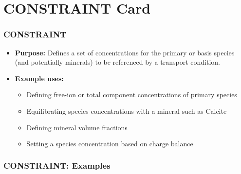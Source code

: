 \section{CONSTRAINT Card}

\begin{frame}\frametitle{CONSTRAINT}

\begin{itemize}
\item[] \textbf{Purpose:} Defines a set of concentrations for the primary or basis species (and potentially minerals) to be referenced by a transport condition.
\item[] \textbf{Example uses:}
\begin{itemize}
  \item Defining free-ion or total component concentrations of primary species
  \item Equilibrating species concentrations with a mineral such as Calcite
  \item Defining mineral volume fractions
  \item Setting a species concentration based on charge balance
\end{itemize}
\end{itemize}

\end{frame}

\begin{frame}[fragile]\frametitle{CONSTRAINT: Examples}

\end{frame}
